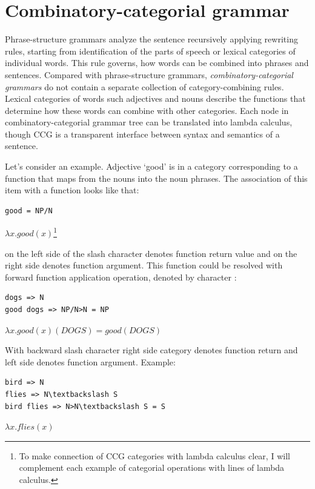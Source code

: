 \section{Combinatory-categorial grammar}

Phrase-structure grammars analyze the sentence recursively applying rewriting rules, starting from identification of the parts of speech or lexical categories of individual words. This rule governs, how words can be combined into phrases and sentences. Compared with phrase-structure grammars, \emph{combinatory-categorial grammars} do not contain a separate collection of category-combining rules. Lexical categories of words such adjectives and nouns describe the functions that determine how these words can combine with other categories. Each node in combinatory-categorial grammar tree can be translated into lambda calculus, though CCG is a transparent interface between syntax and semantics of a sentence. 

Let's consider an example. Adjective ‘good’ is in a category corresponding to a function that maps from the nouns into the noun phrases. The association of this item with a function looks like that:

\begin{verbatim}
good = NP/N 
\end{verbatim}

$\lambda x.good(x)$\footnote{To make connection of CCG categories with lambda calculus clear, I will complement each example of categorial operations with lines of lambda calculus.}

 on the left side of the slash character denotes function return value and  on the right side denotes function argument. This function could be resolved with forward function application operation, denoted by character \code{>}:

\begin{verbatim}
dogs => N
good dogs => NP/N>N = NP
\end{verbatim}

$\lambda x.good(x)(DOGS)=good(DOGS)$

With backward slash character \code{\textbackslash} right side category denotes function return and left side denotes function argument. Example:

\begin{verbatim}
bird => N
flies => N\textbackslash S
bird flies => N>N\textbackslash S = S
\end{verbatim}

$\lambda x.flies(x)$

